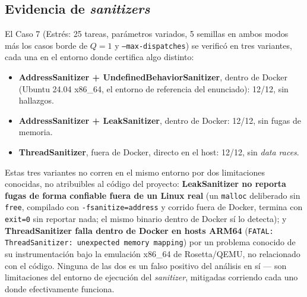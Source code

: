\subsection{Evidencia de \textit{sanitizers}}
\label{sec:sanitizers}

El Caso 7 (Estrés: 25 tareas, parámetros variados, 5 semillas en ambos modos
más los casos borde de $Q=1$ y \texttt{--max-dispatches}) se verificó en tres
variantes, cada una en el entorno donde certifica algo distinto:

\begin{itemize}
\item \textbf{AddressSanitizer + UndefinedBehaviorSanitizer}, dentro de
  Docker (Ubuntu 24.04 x86\_64, el entorno de referencia del enunciado):
  12/12, sin hallazgos.
\item \textbf{AddressSanitizer + LeakSanitizer}, dentro de Docker: 12/12,
  sin fugas de memoria.
\item \textbf{ThreadSanitizer}, fuera de Docker, directo en el host: 12/12,
  sin \textit{data races}.
\end{itemize}

Estas tres variantes no corren en el mismo entorno por dos limitaciones
conocidas, no atribuibles al código del proyecto: \textbf{LeakSanitizer no
reporta fugas de forma confiable fuera de un Linux real} (un
\texttt{malloc} deliberado sin \texttt{free}, compilado con
\texttt{-fsanitize=address} y corrido fuera de Docker, termina con
\texttt{exit=0} sin reportar nada; el mismo binario dentro de Docker sí lo
detecta); y \textbf{ThreadSanitizer falla dentro de Docker en hosts
ARM64} (\texttt{FATAL: ThreadSanitizer: unexpected memory mapping}) por un
problema conocido de su instrumentación bajo la emulación x86\_64 de
Rosetta/QEMU, no relacionado con el código. Ninguna de las dos es un falso
positivo del análisis en sí --- son limitaciones del entorno de ejecución
del \textit{sanitizer}, mitigadas corriendo cada uno donde efectivamente
funciona.
